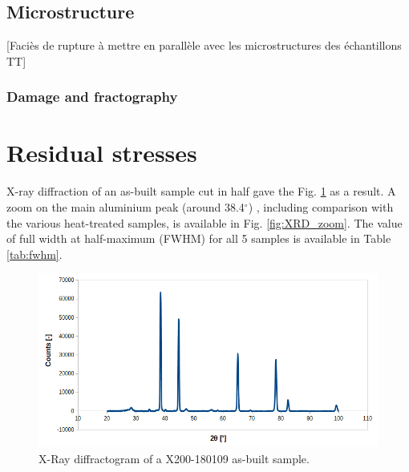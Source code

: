 
\subsection{Microstructure}
[Faciès de rupture à mettre en parallèle avec les microstructures des échantillons TT]


\subsubsection{Damage and fractography}

\section{Residual stresses}

X-ray diffraction of an as-built sample cut in half gave the Fig. \ref{fig:XRD} as a result. A zoom on the main aluminium peak (around 38.4$^\circ$) \cite{Rosenthal14}, including comparison with the various heat-treated samples, is available in Fig. \ref{fig:XRD_zoom}. The value of full width at half-maximum (FWHM) for all 5 samples is available in Table \ref{tab:fwhm}.

\begin{figure}[ht]
	\centering
	\centerline{\includegraphics[scale=0.60]{Images/XRD}}
	\decoRule
	\caption[X-Ray diffractogram of a X200-180109 as-built sample]{X-Ray diffractogram of a X200-180109 as-built sample.}
	\label{fig:XRD}
\end{figure}

